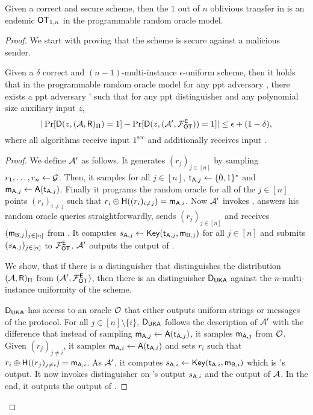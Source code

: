  
\begin{theorem}\label{thm:KAtoOT}

Given a correct and secure \UKA scheme, then the $1$ out of $n$ oblivious transfer in    is an endemic $\mathsf{OT}_{1,n}$ in the programmable random oracle model. 

\end{theorem}

\begin{proof}
We start with proving that the scheme is secure against a malicious sender. 
\begin{claim}\label{claim:malsender}
Given a $\delta$ correct and  $(n-1)$-multi-instance $\epsilon$-uniform \UKA scheme, then it holds that in the programmable random oracle model for any ppt adversary \Adv, there exists a ppt adversary \Adv' such that for any ppt distinguisher \D and any polynomial size auxiliary input $z$,
$$
|\Pr[\mathsf D(z,(\mathcal{A},\mathsf{R})_{\Pi})=1] -\Pr[\mathsf D(z, (\mathcal{A}', \mathcal{F}_{\mathsf{OT}}^\mathsf{E}))=1]|\leq \epsilon+(1-\delta),
$$
where all algorithms receive input $1^\sec$ and \rec additionally receives input \set.
\end{claim}

\begin{proof}
We define $\mathcal{A}'$ as follows. 
It generates $(r_j)_{j\in[n]}$ by sampling $r_1,\dots, r_n\leftarrow \mathcal{G}$. Then, it samples for all $j\in[n]$, $\mathsf{t}_{\mathsf{A},j}\leftarrow\{0,1\}^*$ and $\mathsf{m}_{\mathsf{A},j}\leftarrow\mathsf{A}(\mathsf{t}_{\mathsf{A},j})$. Finally it programs the random oracle for all of the $j\in[n]$ points $(r_i)_{i\neq j}$ such that $r_i\oplus\mathsf{H}((r_i)_{i\neq j})=\mathsf{m}_{\mathsf{A},i}$. Now $\mathcal{A}'$ invokes \Adv, answers his random oracle queries straightforwardly, sends $(r_j)_{j\in[n]}$ and receives $(\mathsf{m}_{\mathsf{B},j})_{j\in[n]}$ from \Adv. It computes $s_{\mathsf{A},j}\leftarrow\mathsf{Key}(\mathsf{t}_{\mathsf{A},j},\mathsf{m}_{\mathsf{B},j})$ for all $j\in[n]$ and submits $(s_{\mathsf{A},j})_{j\in [n]}$ to $\mathcal{F}_{\mathsf{OT}}^{\mathsf{E}}$. $\mathcal{A}'$ outputs the output of \Adv.

We show, that if there is a distinguisher \D that distinguishes the distribution $(\mathcal{A},\mathsf{R})_{\Pi}$ from $(\mathcal{A}',\mathcal{F}_{\mathsf{OT}}^{\mathsf{E}})$, then there is an distinguisher $\mathsf D_{\mathsf{UKA}}$ against the $n$-multi-instance uniformity of the \UKA scheme. 

$\mathsf D_{\mathsf{UKA}}$ has access to an oracle $\mathcal{O}$ that either outputs uniform strings or messages of the \UKA protocol. For all $j\in[n]\setminus\{i\}$, $\mathsf D_{\mathsf{UKA}}$ follows the description of $\mathcal{A}'$ with the difference that instead of sampling  $\mathsf{m}_{\mathsf{A},j}\leftarrow\mathsf{A}(\mathsf{t}_{\mathsf{A},j})$, it samples $\mathsf{m}_{\mathsf{A},j}$ from $\mathcal{O}$. Given $(r_j)_{j\neq i}$, it samples $\mathsf{m}_{\mathsf{A},i}\leftarrow\mathsf{A}(\mathsf{t}_{\mathsf{A},i})$ and sets $r_i$ such that $r_i\oplus\mathsf{H}((r_j)_{j\neq i})=\mathsf{m}_{\mathsf{A},i}$. As $\mathcal{A}'$, it computes $s_{\mathsf{A},i}\leftarrow\mathsf{Key}(\mathsf{t}_{\mathsf{A},i},\mathsf{m}_{\mathsf{B},i})$ which is \rec's output. It now invokes distinguisher \D on \rec's output $s_{\mathsf{A},i}$ and the output of $\mathcal{A}$. In the end, it outputs the output of \D.



\end{proof}
\end{proof}

